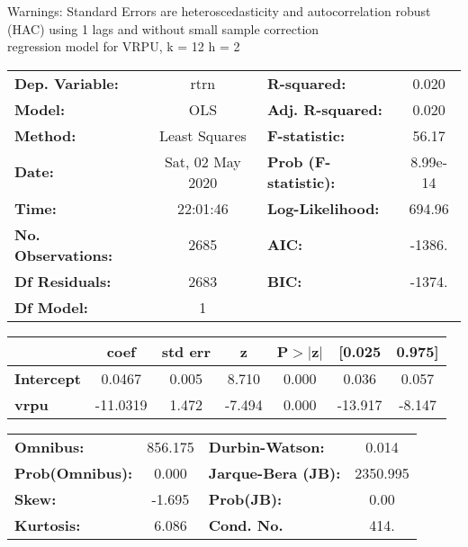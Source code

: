 Warnings: \newline
 [1] Standard Errors are heteroscedasticity and autocorrelation robust (HAC) using 1 lags and without small sample correction\\ 

regression model for VRPU, k = 12 h = 2\begin{center}
\begin{tabular}{lclc}
\toprule
\textbf{Dep. Variable:}    &       rtrn       & \textbf{  R-squared:         } &     0.020   \\
\textbf{Model:}            &       OLS        & \textbf{  Adj. R-squared:    } &     0.020   \\
\textbf{Method:}           &  Least Squares   & \textbf{  F-statistic:       } &     56.17   \\
\textbf{Date:}             & Sat, 02 May 2020 & \textbf{  Prob (F-statistic):} &  8.99e-14   \\
\textbf{Time:}             &     22:01:46     & \textbf{  Log-Likelihood:    } &    694.96   \\
\textbf{No. Observations:} &        2685      & \textbf{  AIC:               } &    -1386.   \\
\textbf{Df Residuals:}     &        2683      & \textbf{  BIC:               } &    -1374.   \\
\textbf{Df Model:}         &           1      & \textbf{                     } &             \\
\bottomrule
\end{tabular}
\begin{tabular}{lcccccc}
                   & \textbf{coef} & \textbf{std err} & \textbf{z} & \textbf{P$> |$z$|$} & \textbf{[0.025} & \textbf{0.975]}  \\
\midrule
\textbf{Intercept} &       0.0467  &        0.005     &     8.710  &         0.000        &        0.036    &        0.057     \\
\textbf{vrpu}      &     -11.0319  &        1.472     &    -7.494  &         0.000        &      -13.917    &       -8.147     \\
\bottomrule
\end{tabular}
\begin{tabular}{lclc}
\textbf{Omnibus:}       & 856.175 & \textbf{  Durbin-Watson:     } &    0.014  \\
\textbf{Prob(Omnibus):} &   0.000 & \textbf{  Jarque-Bera (JB):  } & 2350.995  \\
\textbf{Skew:}          &  -1.695 & \textbf{  Prob(JB):          } &     0.00  \\
\textbf{Kurtosis:}      &   6.086 & \textbf{  Cond. No.          } &     414.  \\
\bottomrule
\end{tabular}
\end{center}

